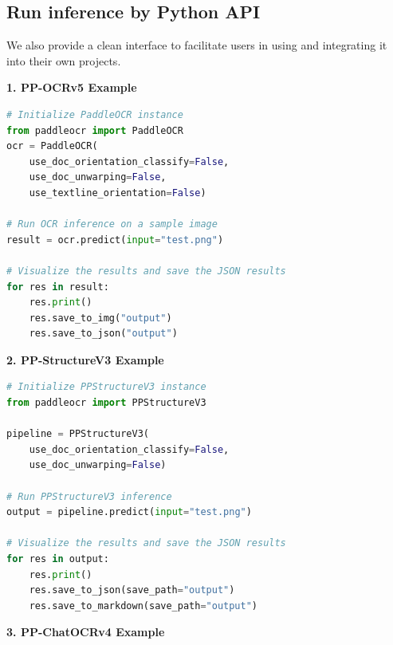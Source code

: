 \documentclass[11pt, a4paper, logo, copyright, nonumbering]{paddleocr}
\begin{document}
\subsection{Run inference by Python API}

We also provide a clean interface to facilitate users in using and integrating it into their own projects.

\textbf{1. PP-OCRv5 Example}

\begin{lstlisting}[language=Python]
# Initialize PaddleOCR instance
from paddleocr import PaddleOCR
ocr = PaddleOCR(
    use_doc_orientation_classify=False,
    use_doc_unwarping=False,
    use_textline_orientation=False)

# Run OCR inference on a sample image 
result = ocr.predict(input="test.png")

# Visualize the results and save the JSON results
for res in result:
    res.print()
    res.save_to_img("output")
    res.save_to_json("output")
\end{lstlisting}

\textbf{2. PP-StructureV3 Example}

\begin{lstlisting}[language=Python]
# Initialize PPStructureV3 instance
from paddleocr import PPStructureV3

pipeline = PPStructureV3(
    use_doc_orientation_classify=False,
    use_doc_unwarping=False)

# Run PPStructureV3 inference 
output = pipeline.predict(input="test.png")

# Visualize the results and save the JSON results
for res in output:
    res.print() 
    res.save_to_json(save_path="output") 
    res.save_to_markdown(save_path="output")    
\end{lstlisting}




\textbf{3. PP-ChatOCRv4 Example}
\end{document}
